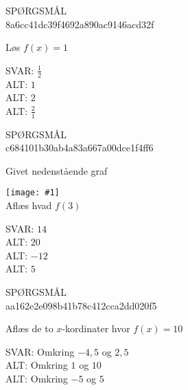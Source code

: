 \documentclass[]{article}
\newcounter{spgcounter}
\newenvironment{question}[2]{\addtocounter{spgcounter}{1} SPØRGSMÅL \thespgcounter\\}{\hspace{50px}}
\newcommand{\image}[1]{\texttt{[image: \#1]}\\}
\newcommand{\answer}[1]{{\color{green} SVAR: #1}\\}
\newcommand{\alt}[1]{{\color{red} ALT: #1}\\}
\begin{document}
\begin{question}{multi}\id{8a6cc41dc39f4692a890ac9146acd32f}
    
Løs $f(x)=1$
        
\answer{$\frac{1}{2}$}
\alt{$1$}
\alt{$2$}
\alt{$\frac{2}{1}$}

\end{question}


\begin{question}{multi}\id{c684101b30ab4a83a667a00dce1f4ff6}
    
Givet nedenstående graf

\image{andengradsfunktionen1.png}

Aflæs hvad $f(3)$

\answer{$14$}
\alt{$20$}
\alt{$-12$}
\alt{$5$}

\end{question}

\begin{question}{multi}\id{aa162e2e098b41b78c412cca2dd020f5}
    
Aflæs de to $x$-kordinater hvor $f(x)=10$
    
\answer{Omkring $-4,5$ og $2,5$}
\alt{Omkring $1$ og $10$}
\alt{Omkring $-5$ og $5$}

\end{question}
\end{document}
